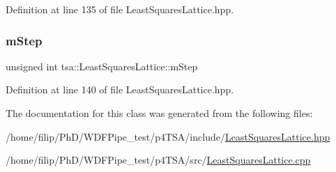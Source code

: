 Definition at line 135 of file Least\+Squares\+Lattice.\+hpp.

\mbox{\label{classtsa_1_1_least_squares_lattice_a17c54dba21bbf5ae79d6687f554eceb9}} 
\subsubsection{\texorpdfstring{m\+Step}{mStep}}
{\footnotesize\ttfamily unsigned int tsa\+::\+Least\+Squares\+Lattice\+::m\+Step\hspace{0.3cm}{\ttfamily [private]}}



Definition at line 140 of file Least\+Squares\+Lattice.\+hpp.



The documentation for this class was generated from the following files\+:\begin{DoxyCompactItemize}
\item 
/home/filip/\+Ph\+D/\+W\+D\+F\+Pipe\+\_\+test/p4\+T\+S\+A/include/\hyperlink{_least_squares_lattice_8hpp}{Least\+Squares\+Lattice.\+hpp}\item 
/home/filip/\+Ph\+D/\+W\+D\+F\+Pipe\+\_\+test/p4\+T\+S\+A/src/\hyperlink{_least_squares_lattice_8cpp}{Least\+Squares\+Lattice.\+cpp}\end{DoxyCompactItemize}
